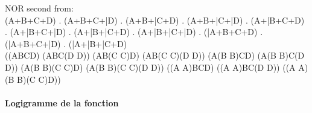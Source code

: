 NOR
 second from: $$$$(A+B+C+D) . (A+B+C+\bar D) . (A+B+\bar C+D) . (A+B+\bar C+\bar D) . (A+\bar B+C+D) . (A+\bar B+C+\bar D) . (A+\bar B+\bar C+D) . (A+\bar B+\bar C+\bar D) . (\bar A+B+C+D) . (\bar A+B+C+\bar D) . (\bar A+\bar B+\bar C+D)$$
$$$$
$$$$
$$((A\downarrow B\downarrow C\downarrow D) \downarrow  (A\downarrow B\downarrow C\downarrow (D \downarrow  D)) \downarrow  (A\downarrow B\downarrow (C \downarrow  C)\downarrow D) \downarrow  (A\downarrow B\downarrow (C \downarrow  C)\downarrow (D \downarrow  D)) \downarrow  (A\downarrow (B \downarrow  B)\downarrow C\downarrow D) \downarrow  (A\downarrow (B \downarrow  B)\downarrow C\downarrow (D \downarrow  D)) \downarrow  (A\downarrow (B \downarrow  B)\downarrow (C \downarrow  C)\downarrow D) \downarrow  (A\downarrow (B \downarrow  B)\downarrow (C \downarrow  C)\downarrow (D \downarrow  D)) \downarrow  ((A \downarrow  A)\downarrow B\downarrow C\downarrow D) \downarrow  ((A \downarrow  A)\downarrow B\downarrow C\downarrow (D \downarrow  D)) \downarrow  ((A \downarrow  A)\downarrow (B \downarrow  B)\downarrow (C \downarrow  C)\downarrow D))$$$$


\paragraph{Logigramme de la fonction}

